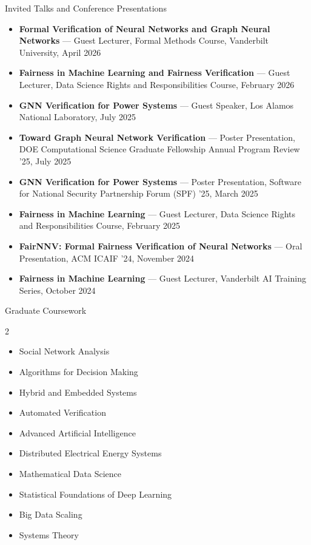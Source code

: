 \documentclass{resume}
\begin{document}
\begin{rSection}{Invited Talks and Conference Presentations}
\begin{itemize}
  \item \textbf{Formal Verification of Neural Networks and Graph Neural Networks} — Guest Lecturer, Formal Methods Course, Vanderbilt University, April 2026
  \item \textbf{Fairness in Machine Learning and Fairness Verification} — Guest Lecturer, Data Science Rights and Responsibilities Course, February 2026
  \item \textbf{GNN Verification for Power Systems} — Guest Speaker, Los Alamos National Laboratory, July 2025
  \item \textbf{Toward Graph Neural Network Verification} — Poster Presentation, DOE Computational Science Graduate Fellowship Annual Program Review '25, July 2025
  \item \textbf{GNN Verification for Power Systems} — Poster Presentation, Software for National Security Partnership Forum (SPF) '25, March 2025
  \item \textbf{Fairness in Machine Learning} — Guest Lecturer, Data Science Rights and Responsibilities Course, February 2025
  \item \textbf{FairNNV: Formal Fairness Verification of Neural Networks} — Oral Presentation, ACM ICAIF ’24, November 2024
  \item \textbf{Fairness in Machine Learning} — Guest Lecturer, Vanderbilt AI Training Series, October 2024
\end{itemize}
\end{rSection}


\begin{rSection}{Graduate Coursework}
\begin{multicols}{2}
\begin{itemize}
\item Social Network Analysis
\item Algorithms for Decision Making
\item Hybrid and Embedded Systems
\item Automated Verification
\item Advanced Artificial Intelligence
\item Distributed Electrical Energy Systems
\item Mathematical Data Science
\item Statistical Foundations of Deep Learning
\item Big Data Scaling
\item Systems Theory
\end{itemize}
\end{multicols}
\end{rSection}
\end{document}
